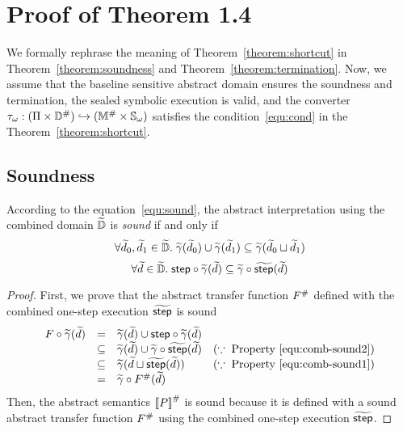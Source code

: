 \section{Proof of Theorem 1.4}\label{sec:proof}

We formally rephrase the meaning of Theorem~\ref{theorem:shortcut} in
Theorem~\ref{theorem:soundness} and Theorem~\ref{theorem:termination}.  Now, we
assume that the baseline sensitive abstract domain ensures the soundness and
termination, the sealed symbolic execution is valid, and the converter
${\tau}_\omega: (\Pi \times {\mathbb{D}}^{\#}) \hookrightarrow ({\mathbb{M}}^{\#} \times
{\mathbb{S}}_\omega)$ satisfies the condition~\ref{equ:cond} in the
Theorem~\ref{theorem:shortcut}.


\subsection{Soundness}

\begin{theorem}[Soundness]\label{theorem:soundness}
  According to the equation~\ref{equ:sound}, the abstract interpretation using
  the combined domain $\widetilde{\mathbb{D}}$ is \textit{sound} if and only if
  \begin{equation}\label{equ:comb-sound1}
    \forall \widetilde{d}_0, \widetilde{d}_1 \in \widetilde{\mathbb{D}}. \; \widetilde{\gamma}(\widetilde{d}_0) \cup
    \widetilde{\gamma}(\widetilde{d}_1) \subseteq \widetilde{\gamma}(\widetilde{d}_0 \sqcup \widetilde{d}_1)
  \end{equation}
  \begin{equation}\label{equ:comb-sound2}
    \forall \widetilde{d} \in \widetilde{\mathbb{D}}. \; \textsf{step} \circ \widetilde{\gamma}(\widetilde{d}) \subseteq
    \widetilde{\gamma} \circ \widetilde{\textsf{step}}(\widetilde{d})\\
  \end{equation}
\end{theorem}
\begin{proof}
  First, we prove that the abstract transfer function ${F}^{\#}$ defined
  with the combined one-step execution $\widetilde{\textsf{step}}$ is sound
  \[
    \begin{array}{rcll}
      F \circ \widetilde{\gamma}(\widetilde{d})
      &=& \widetilde{\gamma}(\widetilde{d}) \cup \textsf{step} \circ \widetilde{\gamma}(\widetilde{d})\\
      &\subseteq& \widetilde{\gamma}(\widetilde{d}) \cup \widetilde{\gamma} \circ \widetilde{\textsf{step}}(\widetilde{d})
      & (\because \; \text{Property~\ref{equ:comb-sound2}})\\
      &\subseteq& \widetilde{\gamma}(\widetilde{d} \sqcup \widetilde{\textsf{step}}(\widetilde{d}))
      & (\because \; \text{Property~\ref{equ:comb-sound1}})\\
      &=& \widetilde{\gamma} \circ {F}^{\#}(\widetilde{d})\\
    \end{array}
  \]
  Then, the abstract semantics ${[\![{P}]\!]}^{\#}$ is sound because it is defined
  with a sound abstract transfer function ${F}^{\#}$ using the combined
  one-step execution $\widetilde{\textsf{step}}$.
\end{proof}

